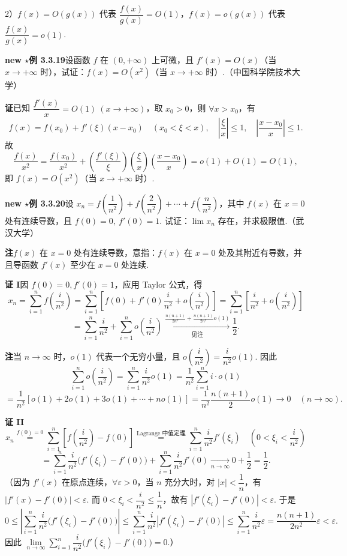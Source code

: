 \documentclass[UTF8, 12pt, fontset=fandol, oneside]{ctexart}
\begin{document}
2）$f(x)=O(g(x))$ 代表 $\dfrac{f(x)}{g(x)}=O(1)$，$f(x)=o(g(x))$ 代表 $\dfrac{f(x)}{g(x)}=o(1)$.

\noindent\textbf{new $\star$例 3.3.19}\quad 设函数 $f$ 在 $(0,+\infty)$ 上可微，且 $f'(x)=O(x)$（当 $x\to+\infty$ 时），试证：$f(x)=O(x^2)$（当 $x\to+\infty$ 时）.（中国科学院技术大学）

\noindent\textbf{证}\quad 已知 $\dfrac{f'(x)}x=O(1)\ (x\to+\infty)$，取 $x_0>0$，则 $\forall x>x_0$，有
\[
  f(x)=f(x_0)+f'(\xi)(x-x_0)\quad(x_0<\xi<x),\quad \left|\frac{\xi}{x}\right|\le1,\quad \left|\frac{x-x_0}{x}\right|\le1.
\]
故
\[
  \frac{f(x)}{x^2}=\frac{f(x_0)}{x^2}
  +\left(\frac{f'(\xi)}{\xi}\right)\left(\frac{\xi}{x}\right)\left(\frac{x-x_0}{x}\right)
  =o(1)+O(1)=O(1),
\]
即 $f(x)=O(x^2)$（当 $x\to+\infty$ 时）.

\noindent\textbf{new $\star$例 3.3.20}\quad 设 $x_n=f\left(\dfrac1{n^2}\right)+f\left(\dfrac2{n^2}\right)+\cdots+f\left(\dfrac n{n^2}\right)$，其中 $f(x)$ 在 $x=0$ 处有连续导数，且 $f(0)=0,\ f'(0)=1$. 试证：$\lim x_n$ 存在，并求极限值.（武汉大学）

\noindent\textbf{注}\quad $f(x)$ 在 $x=0$ 处有连续导数，意指：$f(x)$ 在 $x=0$ 处及其附近有导数，并且导函数 $f'(x)$ 至少在 $x=0$ 处连续.

\noindent\textbf{证 I}\quad 因 $f(0)=0,f'(0)=1$，应用 Taylor 公式，得
\[
  x_n=\sum_{i=1}^n f\left(\frac{i}{n^2}\right)
  =\sum_{i=1}^n\left[f(0)+f'(0)\frac{i}{n^2}+o\left(\frac{i}{n^2}\right)\right]
  =\sum_{i=1}^n\left[\frac{i}{n^2}+o\left(\frac{i}{n^2}\right)\right]
\]
\[
  =\sum_{i=1}^n\frac{i}{n^2}+\sum_{i=1}^n o\left(\frac{i}{n^2}\right)
  \xrightarrow[\text{见注}]{\frac{n(n+1)}{2n^2}+\frac{n(n+1)}{2n^2}o(1)}
  \frac12.
\]

\noindent\textbf{注}\quad 当 $n\to\infty$ 时，$o(1)$ 代表一个无穷小量，且 $o\left(\dfrac{i}{n^2}\right)=\dfrac{i}{n^2}o(1)$. 因此
\[
  \sum_{i=1}^n o\left(\frac{i}{n^2}\right)
  =\sum_{i=1}^n\frac{i}{n^2}o(1)
  =\frac1{n^2}\sum_{i=1}^n i\cdot o(1)
\]
\[
  =\frac1{n^2}[o(1)+2o(1)+3o(1)+\cdots+no(1)]
  =\frac1{n^2}\frac{n(n+1)}2o(1)\to0\quad(n\to\infty).
\]

\noindent\textbf{证 II}\quad
\[
  x_n\overset{f(0)=0}{=}\sum_{i=1}^n\left[f\left(\frac{i}{n^2}\right)-f(0)\right]
  \overset{\text{Lagrange 中值定理}}{=}
  \sum_{i=1}^n\frac{i}{n^2}f'(\xi_i)\quad\left(0<\xi_i<\frac{i}{n^2}\right)
\]
\[
  =\sum_{i=1}^n\frac{i}{n^2}\bigl(f'(\xi_i)-f'(0)\bigr)+\sum_{i=1}^n\frac{i}{n^2}f'(0)
  \xrightarrow[n\to\infty]{}0+\frac12=\frac12.
\]
（因为 $f'(x)$ 在原点连续，$\forall\varepsilon>0$，当 $n$ 充分大时，对 $|x|<\dfrac1n$，有 $|f'(x)-f'(0)|<\varepsilon$. 而 $0<\xi_i<\dfrac{i}{n^2}\le\dfrac1n$，故有 $|f'(\xi_i)-f'(0)|<\varepsilon$. 于是
\[
  0\le \left|\sum_{i=1}^n\frac{i}{n^2}\bigl(f'(\xi_i)-f'(0)\bigr)\right|
  \le\sum_{i=1}^n\frac{i}{n^2}|f'(\xi_i)-f'(0)|
  \le\sum_{i=1}^n\frac{i}{n^2}\varepsilon=\frac{n(n+1)}{2n^2}\varepsilon<\varepsilon.
\]
因此 $\lim\limits_{n\to\infty}\sum\limits_{i=1}^n\dfrac{i}{n^2}\bigl(f'(\xi_i)-f'(0)\bigr)=0$.）
\end{document}

